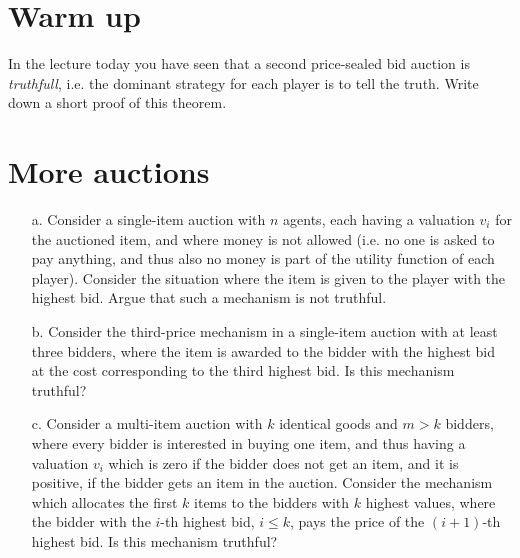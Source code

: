 \documentclass{../ape}
\begin{document}

\section{Warm up}

In the lecture today you have seen that a second price-sealed bid auction is \emph{truthfull}, i.e. the dominant strategy for each player is to tell the truth. Write down a short proof of this theorem.

\section{More auctions}
\begin{enumerate}
 \item[a.]
  Consider a single-item auction with $n$ agents, each having a valuation $v_i$ for the auctioned item, and where money is not allowed (i.e. no one is asked to pay anything, and thus also no money is part of the utility function of each player). Consider the situation where the item is given to the player with the highest bid. Argue that such a mechanism is not truthful.
 \item[b.]
 Consider the third-price mechanism in a single-item auction with at least three bidders, where the item is awarded to the bidder with the highest bid at the cost corresponding to the third highest bid. Is this mechanism truthful?
 \item[c.]
 Consider a multi-item auction with $k$ identical goods and $m > k$ bidders, where every bidder is interested in buying one item, and thus having a valuation $v_i$ which is zero if the bidder does not get an item, and it is positive, if the bidder gets an item in the auction. Consider the mechanism which allocates the first $k$ items to the bidders with $k$ highest values, where the bidder with the $i$-th highest bid, $i \leq k$, pays the price of the $(i +1)$-th highest bid. Is this mechanism truthful?
\end{enumerate}
\end{document}
